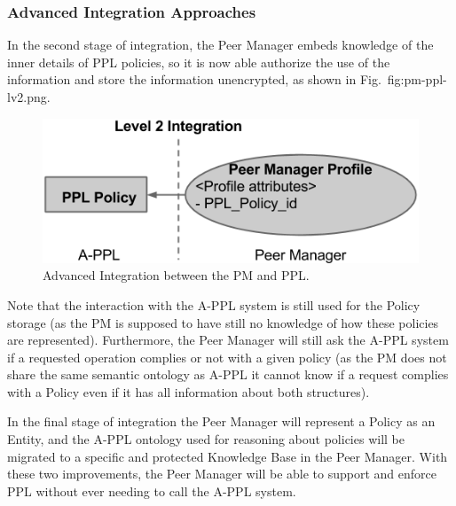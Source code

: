 \subsubsection{Advanced Integration Approaches}
In the second stage of integration, the Peer Manager embeds knowledge of the inner details of PPL policies, so it is now able authorize the use of the information and store the information unencrypted, as shown in Fig.~{fig:pm-ppl-lv2.png}.

\begin{figure}[htb!]
\centering
\includegraphics[width=0.6\linewidth]{figures/pm-ppl-lv2.png}
\caption{Advanced Integration between the PM and PPL.}
\label{fig:pm-ppl-lv2.png}
\end{figure}

Note that the interaction with the A-PPL system is still used for the Policy storage (as the PM is supposed to have still no knowledge of how these policies are represented). Furthermore, the Peer Manager will still ask the A-PPL system if a requested operation complies or not with a given policy (as the PM does not share the same semantic ontology as A-PPL it cannot know if a request complies with a Policy even if it has all information about both structures).

In the final stage of integration the Peer Manager will represent a Policy as an Entity, and the A-PPL ontology used for reasoning about policies will be migrated to a specific and protected Knowledge Base in the Peer Manager.
With these two improvements, the Peer Manager will be able to support and enforce PPL without ever needing to call the A-PPL system. 


